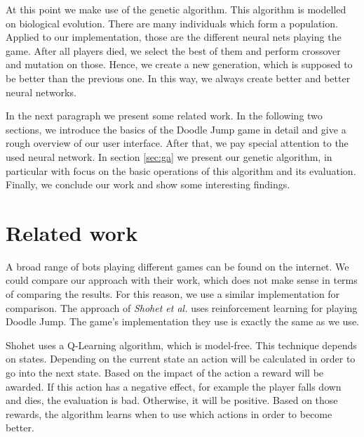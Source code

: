 \documentclass[a4paper,12pt,pagesize,headsepline,bibtotoc,titlepage,abstracton]{scrartcl}
\begin{document}
At this point we make use of the genetic algorithm. This algorithm is modelled on biological evolution. There are many individuals which form a population. Applied to our implementation, those are the different neural nets playing the game. After all players died, we select the best of them and perform crossover and mutation on those. Hence, we create a new generation, which is supposed to be better than the previous one. In this way, we always create better and better neural networks.

In the next paragraph we present some related work. In the following two sections, we introduce the basics of the Doodle Jump game in detail and give a rough overview of our user interface. After that, we pay special attention to the used neural network. In section \ref{sec:ga} we present our genetic algorithm, in particular with focus on the basic operations of this algorithm and its evaluation. Finally, we conclude our work and show some interesting findings.


\section{Related work}

A broad range of bots playing different games can be found on the internet. We could compare our approach with their work, which does not make sense in terms of comparing the results. For this reason, we use a similar implementation for comparison. The approach of \textit{Shohet et al.}\cite{eshohet} uses reinforcement learning for playing Doodle Jump. The game's implementation they use is exactly the same as we use.

Shohet uses a Q-Learning algorithm, which is model-free. This technique depends on states. Depending on the current state an action will be calculated in order to go into the next state. Based on the impact of the action a reward will be awarded. If this action has a negative effect, for example the player falls down and dies, the evaluation is bad. Otherwise, it will be positive. Based on those rewards, the algorithm learns when to use which actions in order to become better.
\end{document}

